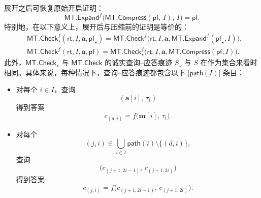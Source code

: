 \documentclass[american,singlepageview]{snargs-book-zh}
\newcommand{\ProtoSalt}{\tau}
\newcommand{\ROFunction}{f}
\newcommand{\ROHonestTrace}{S}
\newcommand{\MTDepth}{d}
\newcommand{\MTPath}{\mathsf{path}}
\newcommand{\MTLayer}{j}
\newcommand{\MTSymbol}{\mathsf{MT}}
\newcommand{\MTCheck}{\MTSymbol.\mathsf{Check}}
\newcommand{\MTVertexLabel}{c}
\newcommand{\MTVertexLabelByName}[2]{\MTVertexLabel_{(#1,#2)}}
\newcommand{\MTCommitment}{\mathsf{rt}}
\newcommand{\MTProof}{\mathsf{pf}}
\newcommand{\MTMessageIndex}{i}
\newcommand{\MTMessageIndexSet}{I}
\newcommand{\MTMessageEntry}{m}
\newcommand{\MTMessageVector}{\mathbf{\MTMessageEntry}}
\newcommand{\MTMessageSubVector}{\mathbf{a}}
\newcommand{\MTSaltString}{\ProtoSalt}
\newcommand{\MTCompressOpening}{\MTSymbol.\mathsf{Compress}}
\newcommand{\MTExpandOpening}{\MTSymbol.\mathsf{Expand}}
\begin{document}
\begin{itemize}
  展开之后可恢复原始开启证明：
  \[
    \MTExpandOpening^{\ROFunction}\bigl(\MTCompressOpening(\MTProof,\,\MTMessageIndexSet),\,\MTMessageIndexSet\bigr)
    = 
    \MTProof.
  \]
  特别地，在以下意义上，展开后与压缩前的证明是等价的：
  \begin{align*}
    &\MTCheck_{\star}^{\ROFunction}(\MTCommitment,\MTMessageIndexSet,\MTMessageSubVector,\MTProof_{\star})
    = 
    \MTCheck^{\ROFunction}\bigl(\MTCommitment,\MTMessageIndexSet,\MTMessageSubVector,\MTExpandOpening^{\ROFunction}(\MTProof_{\star},\MTMessageIndexSet)\bigr),
    \\
    &\MTCheck^{\ROFunction}(\MTCommitment,\MTMessageIndexSet,\MTMessageSubVector,\MTProof)
    =
    \MTCheck_{\star}^{\ROFunction}\bigl(\MTCommitment,\MTMessageIndexSet,\MTMessageSubVector,\MTCompressOpening(\MTProof,\MTMessageIndexSet)\bigr).
  \end{align*}
  此外，$\MTCheck_{\star}$ 与 $\MTCheck$ 的诚实查询–应答痕迹 $\ROHonestTrace_{\star}$ 与 $\ROHonestTrace$ 在作为集合来看时相同。具体来说，每种情况下，查询–应答痕迹都包含以下 $\lvert\MTPath(\MTMessageIndexSet)\rvert$ 条目：
  \begin{itemize}[nolistsep]
    \item 对每个 $\MTMessageIndex\in\MTMessageIndexSet$，查询
    \[
      (\MTMessageSubVector[\MTMessageIndex],\,\MTSaltString_{\MTMessageIndex})
    \]
    得到答案
    \[
      \MTVertexLabelByName{\MTDepth}{\MTMessageIndex}
      =
      \ROFunction\bigl(\MTMessageVector[\MTMessageIndex],\,\MTSaltString_{\MTMessageIndex}\bigr).
    \]
    \item 对每个
    \[
      (\MTLayer,\MTMessageIndex)\in\bigcup_{\MTMessageIndex\in\MTMessageIndexSet}\MTPath(\MTMessageIndex)\setminus\{(\MTDepth,\MTMessageIndex)\},
    \]
    查询
    \[
      \bigl(\MTVertexLabelByName{\MTLayer+1}{2\MTMessageIndex-1},\,\MTVertexLabelByName{\MTLayer+1}{2\MTMessageIndex}\bigr)
    \]
    得到答案
    \[
      \MTVertexLabelByName{\MTLayer}{\MTMessageIndex}
      =
      \ROFunction\bigl(\MTVertexLabelByName{\MTLayer+1}{2\MTMessageIndex-1},\,\MTVertexLabelByName{\MTLayer+1}{2\MTMessageIndex}\bigr).
    \]
  \end{itemize}
\end{itemize}
\end{document}
